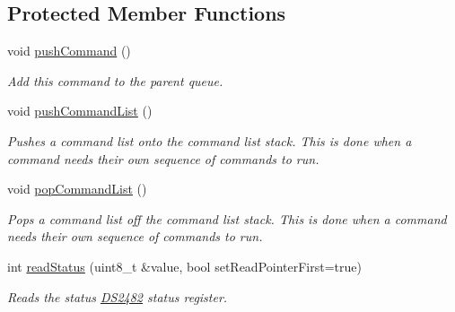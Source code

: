 \subsection*{Protected Member Functions}
\begin{DoxyCompactItemize}
\item 
\mbox{\label{class_d_s2482_command_a95a7c2c3e6e2ae2257cd64702d3458b7}} 
void \mbox{\hyperlink{class_d_s2482_command_a95a7c2c3e6e2ae2257cd64702d3458b7}{push\+Command}} ()
\begin{DoxyCompactList}\small\item\em Add this command to the parent queue. \end{DoxyCompactList}\item 
\mbox{\label{class_d_s2482_command_a8841b3f17a884d3776d969fe2cbe01dd}} 
void \mbox{\hyperlink{class_d_s2482_command_a8841b3f17a884d3776d969fe2cbe01dd}{push\+Command\+List}} ()
\begin{DoxyCompactList}\small\item\em Pushes a command list onto the command list stack. This is done when a command needs their own sequence of commands to run. \end{DoxyCompactList}\item 
\mbox{\label{class_d_s2482_command_a3947439010c45355cfb457154764ae37}} 
void \mbox{\hyperlink{class_d_s2482_command_a3947439010c45355cfb457154764ae37}{pop\+Command\+List}} ()
\begin{DoxyCompactList}\small\item\em Pops a command list off the command list stack. This is done when a command needs their own sequence of commands to run. \end{DoxyCompactList}\item 
\mbox{\label{class_d_s2482_command_ad8fc03f37fadcc79d73e0697b9dcfdbf}} 
int \mbox{\hyperlink{class_d_s2482_command_ad8fc03f37fadcc79d73e0697b9dcfdbf}{read\+Status}} (uint8\+\_\+t \&value, bool set\+Read\+Pointer\+First=true)
\begin{DoxyCompactList}\small\item\em Reads the status \mbox{\hyperlink{class_d_s2482}{D\+S2482}} status register. \end{DoxyCompactList}\item 

\end{DoxyCompactItemize}
